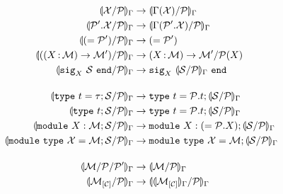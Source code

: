 \begin{align*}
  \Ostrengthen{\E}{l}{\iP}{\iX}
  &\to \Ostrengthen{\E}{l}{\iP}{\lookup{\E}{\iX}}\\
  \Ostrengthen{\E}{l}{\iP}{\iP'.\iX}
  &\to \Ostrengthen{\E}{l}{\iP}{\lookup{\E}{\iP'.\iX}}\\
  \Ostrengthen{\E}{l}{\iP}{\Salias{\iP'}}
  &\to \Salias{\iP'}\\
  \Ostrengthen{\E}{l}{\iP}{(\Sfunctor{\ix}{\iM}{\iM'})}
  &\to \Sfunctor{\ix}{\iM}{\Sstrengthen{l}{\iP(X)}{\iM'}}\\
  \Ostrengthen{\E}{l}{\iP}{\Ssig{\ix}{\iS}}
  &\to \Ssig{\ix}{\Ostrengthen{\E}{l}{\iP}{\iS}}\\[4mm]
  \Ostrengthen{\E}{l}{\iP}{\Stype{t}{\tau};\iS}
  &\to \Stype{t}{\iP.t};\Ostrengthen{\E}{l}{\iP}{\iS} %
  \\
  \Ostrengthen{\E}{l}{\iP}{\Stypeabs{t};\iS}
  &\to \Stype{t}{\iP.t};\Ostrengthen{\E}{l}{\iP}{\iS} %
  \\
  \Ostrengthen{\E}{l}{\iP}{\Smodulety{\ix}{\iM};\iS}
  &\to \Smodulety{\ix}{\Salias{\iP.\ix}};
    \Ostrengthen{\E}{l}{\iP}{\iS} %
  \\
  \Ostrengthen{\E}{l}{\iP}{\Smoduletype{\iX}{\iM};\iS}
  &\to \Smoduletype{\iX}{\iM};
    \Ostrengthen{\E}{l}{\iP}{\iS} \\[4mm]
  \Ostrengthen{\E}{l'}{\iP'}{\Sstrengthen{l}{\iP}{\iM}}
  &\to \Ostrengthen{\E}{l}{\iP}{\iM}\\
  \Ostrengthen{\E}{l}{\iP}{\Senrich{\iC}{\iM}}
  &\to \Ostrengthen{\E}{l}{\iP}{\Oenrich{\E}{\iC}{\iM}}\\
\end{align*}\vspace{-3mm}

